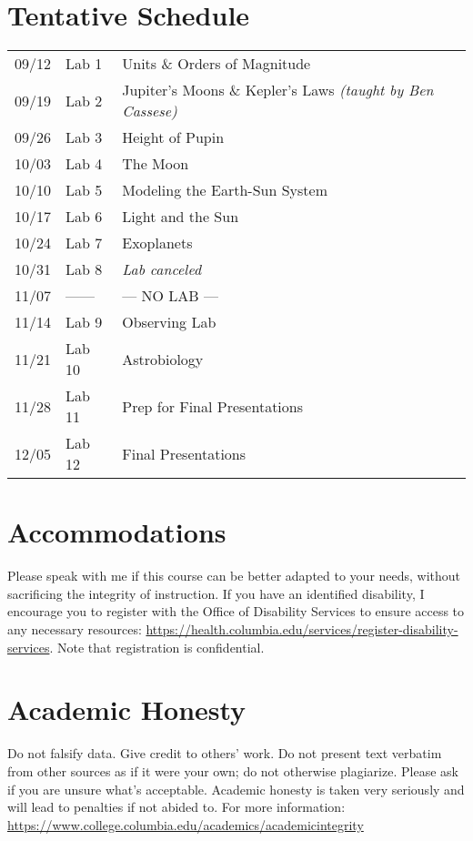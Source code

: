 \documentclass[10pt]{article}
\begin{document}
\section*{Tentative Schedule}
\vspace{-1em}
\begin{table}[h!]
    \begin{tabular}{l|l|l}
        09/12 & Lab 1 & Units \& Orders of Magnitude\\%
        09/19 & Lab 2 & Jupiter's Moons \& Kepler's Laws \textit{(taught by Ben Cassese)}\\
        09/26 & Lab 3 & Height of Pupin\\
        10/03 & Lab 4 & The Moon\\
        10/10 & Lab 5 & Modeling the Earth-Sun System\\
        10/17 & Lab 6 & Light and the Sun\\
        10/24 & Lab 7 & Exoplanets\\
        10/31 & Lab 8 & \textit{Lab canceled}\\
        11/07 & ------ & --- NO LAB ---\\
        11/14 & Lab 9 & Observing Lab\\
        11/21 & Lab 10 & Astrobiology\\
        11/28 & Lab 11 & Prep for Final Presentations\\
        12/05 & Lab 12 & Final Presentations\\
    \end{tabular}
    \label{tab:schedule}
\end{table}

\vspace{-2em}
\section*{Accommodations}
Please speak with me if this course can be better adapted to your needs, without sacrificing the integrity of instruction. If you have an identified disability, I encourage you to register with the Office of Disability Services to ensure access to any necessary resources: \url{https://health.columbia.edu/services/register-disability-services}. Note that registration is confidential.
 
\section*{Academic Honesty}
Do not falsify data. Give credit to others' work. Do not present text verbatim from other sources as if it
were your own; do not otherwise plagiarize. Please ask if you are unsure what's acceptable. Academic honesty is taken very seriously and will lead to penalties if not abided to. For more information: \url{https://www.college.columbia.edu/academics/academicintegrity}
 
\end{document}
